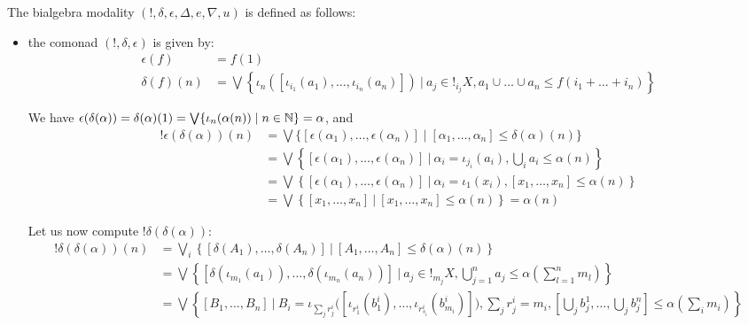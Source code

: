 The bialgebra modality $(!, \delta, \epsilon, \Delta, e, \nabla,u)$ is defined as follows:
\begin{itemize}
\item the comonad $(!,\delta,\epsilon)$ is given by:
\begin{align*}
\epsilon(f)& =  f(1) \\
\delta(f)(n) & = \bigvee\left\{ 
\iota_{n}([\iota_{i_{1}}(a_{1}), \dots , \iota_{i_{n}}(a_{n})]) \ \Big \vert \ 
a_{j}\in !_{i_{j}}X,  
a_{1}\cup \dots \cup a_{n}\leq f(i_{1}+\dots+ i_{n})
\right\}
\end{align*}

We have $\epsilon(\delta(\alpha))=\delta(\alpha)(1)=
\bigvee\{\iota_{n}(\alpha(n))\mid n\in \mathbb{N}\}=\alpha$, and 
\begin{align*}
!\epsilon(\delta(\alpha))(n)&=
\bigvee\{ [\epsilon(\alpha_{1}),\dots, \epsilon(\alpha_{n})]
\mid
[\alpha_{1},\dots, \alpha_{n}] \leq \delta(\alpha)(n)\}
 \\
 &=
 \bigvee\left \{ [\epsilon(\alpha_{1}),\dots, \epsilon(\alpha_{n})]
\ \Bigg \vert \ 
\alpha_{i}=\iota_{j_{i}}(a_{i}),\bigcup_{i}a_{i}\leq 
%
\alpha(n)
\right \} \\
&=
 \bigvee\left \{ [\epsilon(\alpha_{1}),\dots, \epsilon(\alpha_{n})]
\ \Bigg \vert \ 
\alpha_{i}=\iota_{1}(x_{i}),[x_{1},\dots, x_{n}]\leq 
\alpha(n)
\right \} \\
&= \bigvee\left \{ [
x_{1},\dots, x_{n}] \ \Bigg \vert  \ 
[x_{1},\dots, x_{n}]\leq \alpha(n)
\right \} = \alpha(n)
 \end{align*}


Let us now compute $!\delta(\delta (\alpha))$: 
{\small
\begin{align*}
!\delta(\delta(\alpha))(n)&=\bigvee_{i}\left \{[\delta(A_{1}),\dots, \delta(A_{n})]\ \Bigg\vert \   [A_{1},\dots, A_{n}]\leq \delta(\alpha)(n)\right\}\\
&=\bigvee\left \{[\delta(\iota_{m_{1}}(a_{1})),\dots, \delta(\iota_{m_{n}}(a_{n}))]\ \Bigg\vert \  
a_{j}\in !_{m_{j}}X, 
\bigcup_{j=1}^{n}a_{j}\leq \alpha(\sum_{l=1}^{n}m_{l})
\right\}\\
&= \bigvee \left\{
[ B_{1},\dots, B_{n}] \ \Bigg \vert \ 
B_{i}=\iota_{\sum_{j}r_{j}^{i}}\big([\iota_{r_{1}^{i}}(b_{1}^{i}),\dots, \iota_{r_{s_{i}}^{i}}(b_{m_{i}}^{i})]\big),\sum_{j}r_{j}^{i}=m_{i}, 
\left [\bigcup_{j}b_{j}^{1},\dots, \bigcup_{j}b_{j}^{n}\right ]\leq \alpha(\sum_{i}m_{i})
\right \}
\end{align*}
}



\end{itemize}

